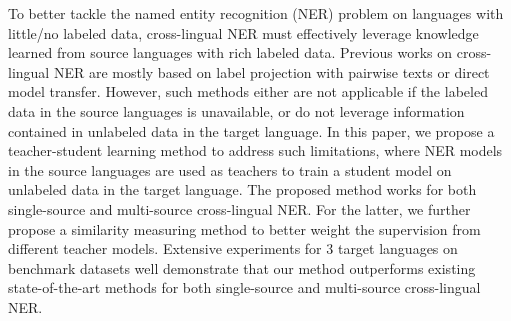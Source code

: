 To better tackle the named entity recognition (NER) problem on languages with little/no labeled data, cross-lingual NER must effectively leverage knowledge learned from source languages with rich labeled data. Previous works on cross-lingual NER are mostly based on label projection with pairwise texts or direct model transfer. However, such methods either are not applicable if the labeled data in the source languages is unavailable, or do not leverage information contained in unlabeled data in the target language. In this paper, we propose a teacher-student learning method to address such limitations, where NER models in the source languages are used as teachers to train a student model on unlabeled data in the target language. The proposed method works for both single-source and multi-source cross-lingual NER. For the latter, we further propose a similarity measuring method to better weight the supervision from different teacher models. Extensive experiments for 3 target languages on benchmark datasets well demonstrate that our method outperforms existing state-of-the-art methods for both single-source and multi-source cross-lingual NER.
